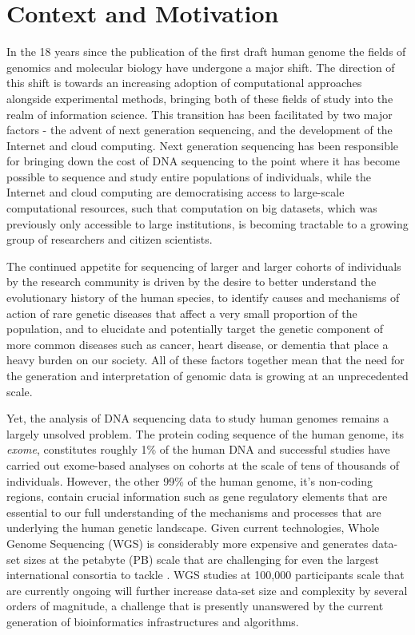 \section{Context and Motivation}
In the 18 years since the publication of the first draft human genome\autocite{lander2001initial} the fields of genomics and molecular biology have undergone a major shift. The direction of this shift is towards an increasing adoption of computational approaches alongside experimental methods, bringing both of these fields of study into the realm of information science. This transition has been facilitated by two major factors - the advent of next generation sequencing\autocite{schuster2007next}, and the development of the Internet and cloud computing\autocite{buyya2009cloud}. Next generation sequencing has been responsible for bringing down the cost of DNA sequencing to the point where it has become possible to sequence and study entire populations of individuals\autocite{gudbjartsson2015large}, while the Internet and cloud computing are democratising access to large-scale computational resources, such that computation on big datasets, which was previously only accessible to large institutions, is becoming tractable to a growing group of researchers and citizen scientists.

The continued appetite for sequencing of larger and larger cohorts of individuals by the research community is driven by the desire to better understand the evolutionary history of the human species\autocite{jobling2013human}, to identify causes and mechanisms of action of rare genetic diseases that affect a very small proportion of the population\autocite{boycott2013rare}, and to elucidate and potentially target the genetic component of more common diseases such as cancer\autocite{weinstein2013cancer}, heart disease\autocite{bruneau2008developmental}, or dementia\autocite{selkoe1996amyloid} that place a heavy burden on our society. All of these factors together mean that the need for the generation and interpretation of genomic data is growing at an unprecedented scale.

Yet, the analysis of DNA sequencing data to study human genomes remains a largely unsolved problem. The protein coding sequence of the human genome, its \emph{exome}, constitutes roughly 1\% of the human DNA and successful studies have carried out exome-based analyses on cohorts at the scale of tens of thousands of individuals\autocite{lek2016analysis}. However, the other 99\% of the human genome, it's non-coding regions, contain crucial information such as gene regulatory elements\autocite{encode2012integrated} that are essential to our full understanding of the mechanisms and processes that are underlying the human genetic landscape. Given current technologies, Whole Genome Sequencing (WGS) is considerably more expensive and generates data-set sizes at the petabyte (PB) scale that are challenging for even the largest international consortia to tackle \autocite{stein2015data}. WGS studies at 100,000 participants scale that are currently ongoing\autocite{turnbull2018100} will further increase data-set size and complexity by several orders of magnitude, a challenge that is presently unanswered by the current generation of bioinformatics infrastructures and algorithms.  

